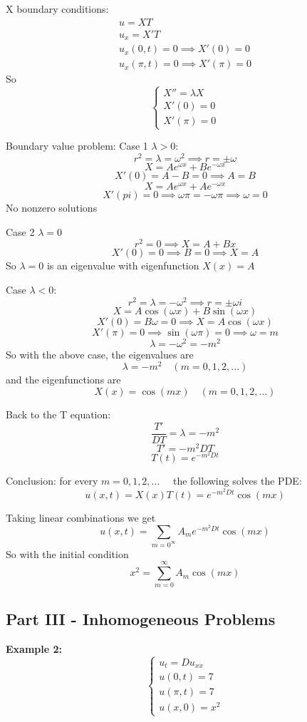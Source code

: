 \documentclass[12pt]{article}
\begin{document}
X boundary conditions:
\begin{align*}
    u = XT\\
    u_x = X'T\\
    u_x(0, t) = 0 \implies X'(0) = 0\\
    u_x(\pi, t) = 0 \implies X'(\pi) = 0
\end{align*}
So 
\[\begin{cases}
    X'' = \lambda X\\
    X'(0) = 0\\
    X'(\pi) = 0
\end{cases}\]

Boundary value problem:
Case 1 $\lambda > 0$:
\[r^2 = \lambda = \omega^2 \implies r = \pm \omega\]
\[X = Ae^{\omega x} + Be^{-\omega x}\]
\[X'(0) = A - B = 0 \implies A = B\]
\[X = Ae^{\omega x} + Ae^{-\omega x}\]
\[X'(pi) = 0 \implies \omega \pi = -\omega \pi \implies \omega = 0\]
No nonzero solutions

Case 2 $\lambda = 0$
\[r^2 = 0 \implies X = A + Bx\]
\[X'(0) = 0 \implies B = 0\implies X = A\]
So $\lambda = 0$ is an eigenvalue with eigenfunction $X(x) = A$

Case $\lambda < 0$:
\[r^2 = \lambda = -\omega^2 \implies r = \pm \omega i\]
\[X = A\cos(\omega x) + B\sin(\omega x)\]
\[X'(0) = B\omega = 0 \implies X = A\cos(\omega x)\]
\[X'(\pi) = 0 \implies \sin(\omega \pi)=0 \implies \omega = m\]
\[\lambda = -\omega^2 = -m^2\]
So with the above case, the eigenvalues are 
\[\lambda = -m^2 \quad (m = 0, 1, 2, ...)\]
and the eigenfunctions are 
\[X(x) = \cos(mx) \quad (m = 0, 1, 2,...)\]

Back to the T equation:
\[\frac{T'}{DT} = \lambda = -m^2\]
\[T' = -m^2DT\]
\[T(t) = e^{-m^2Dt}\]

Conclusion: 
for every $m = 0, 1, 2, ...\quad $ the following solves the PDE:
\[u(x, t) = X(x)T(t) = e^{-m^2Dt}\cos(mx)\]

Taking linear combinations we get 
\[u(x, t) = \sum_{m=0^\infty}A_m e^{-m^2Dt}\cos(mx)\]
So with the initial condition 
\[x^2 = \sum_{m=0}^\infty A_m \cos(mx)\]

\subsection*{Part III - Inhomogeneous Problems}
\textbf{Example 2:}
\[\begin{cases}
    u_t = Du_{xx}\\
    u(0, t) = 7\\
    u(\pi, t) = 7\\
    u(x, 0) = x^2
\end{cases}\]
\end{document}
